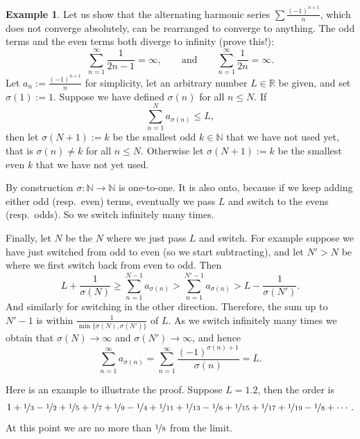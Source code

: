 \documentclass[12pt]{book}
\newcommand{\R}{{\mathbb{R}}}
\newcommand{\N}{{\mathbb{N}}}
\theoremstyle{plain}
\theoremstyle{remark}
\theoremstyle{definition}
\theoremstyle{exercise}
\theoremstyle{example}
\newtheorem{example}[thm]{Example}
\begin{document}
\begin{example} \label{example:harmonsumanything}
Let us show that the alternating harmonic series $\sum
\frac{{(-1)}^{n+1}}{n}$, which does not converge absolutely, can be
rearranged to converge to anything.
The odd terms and the even terms both diverge to
infinity (prove this!):
\begin{equation*}
\sum_{n=1}^\infty \frac{1}{2n-1} = \infty, \qquad \text{and} \qquad
\sum_{n=1}^\infty \frac{1}{2n} = \infty .
\end{equation*}
Let $a_n := \frac{{(-1)}^{n+1}}{n}$ for simplicity, 
let an arbitrary number $L \in \R$ be given, and set $\sigma(1) := 1$.
Suppose we have
defined $\sigma(n)$ for all $n \leq N$.  If
\begin{equation*}
\sum_{n=1}^N a_{\sigma(n)} \leq L ,
\end{equation*}
then let $\sigma(N+1) := k$ be the smallest odd $k \in \N$
that we have not used yet,
that is $\sigma(n) \not= k$ for all $n \leq N$.
Otherwise let $\sigma(N+1) := k$ 
be the smallest even $k$ that we have not yet used.

By construction $\sigma \colon \N \to \N$ is one-to-one.
It is also onto, because if we keep adding either odd (resp.\ even) terms,
eventually we pass $L$ and switch
to the evens (resp.\ odds).  So we switch infinitely many times.

Finally, let $N$ be the $N$ where we just pass $L$ and switch.
For example suppose we have just switched from odd to even (so we start
subtracting),
and let $N' > N$ be where we first switch back from even to odd.  Then
\begin{equation*}
L + \frac{1}{\sigma(N)} \geq \sum_{n=1}^{N-1} a_{\sigma(n)}
> \sum_{n=1}^{N'-1} a_{\sigma(n)} > L- \frac{1}{\sigma(N')}.
\end{equation*}
And similarly for switching in the other direction.  Therefore,
the sum up to $N'-1$ is within $\frac{1}{\min \{ \sigma(N), \sigma(N') \}}$
of $L$.  As
we switch infinitely many times we obtain that $\sigma(N) \to \infty$
and $\sigma(N') \to \infty$, and hence
\begin{equation*}
\sum_{n=1}^\infty a_{\sigma(n)} = 
\sum_{n=1}^\infty \frac{{(-1)}^{\sigma(n)+1}}{\sigma(n)} = L .
\end{equation*}

Here is an example to illustrate the proof.  Suppose $L=1.2$, then the order
is
\begin{equation*}
1+\nicefrac{1}{3}-\nicefrac{1}{2}+\nicefrac{1}{5}+\nicefrac{1}{7}+\nicefrac{1}{9}-\nicefrac{1}{4}+\nicefrac{1}{11}+\nicefrac{1}{13}-\nicefrac{1}{6}
+\nicefrac{1}{15}+\nicefrac{1}{17}+\nicefrac{1}{19} - \nicefrac{1}{8} + \cdots .
\end{equation*}
At this point we are no more than $\nicefrac{1}{8}$ from the limit.
\end{example}
\end{document}
